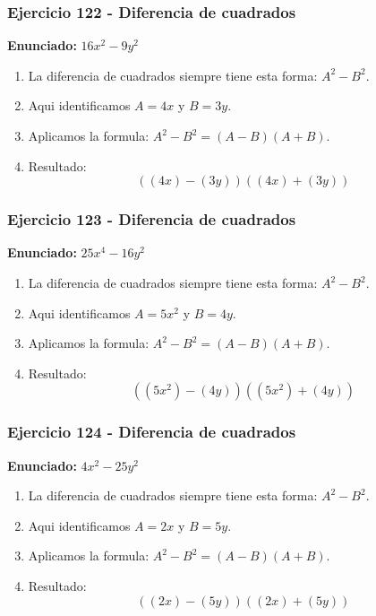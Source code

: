 \documentclass[11pt,a4paper]{article}
\begin{document}
\vspace{0.2cm}
\subsubsection*{Ejercicio 122 - Diferencia de cuadrados}
\textbf{Enunciado:} $ 16 x^{2} - 9 y^{2} $\par
\begin{enumerate}[leftmargin=2em]
\item La diferencia de cuadrados siempre tiene esta forma: \(A^2-B^2\).
\item Aqui identificamos \(A=4 x\) y \(B=3 y\).
\item Aplicamos la formula: \(A^2-B^2=(A-B)(A+B)\).
\item Resultado: \[\boxed{\left(\left(4 x\right)-\left(3 y\right)\right)\left(\left(4 x\right)+\left(3 y\right)\right)}\]
\end{enumerate}

\vspace{0.2cm}
\subsubsection*{Ejercicio 123 - Diferencia de cuadrados}
\textbf{Enunciado:} $ 25 x^{4} - 16 y^{2} $\par
\begin{enumerate}[leftmargin=2em]
\item La diferencia de cuadrados siempre tiene esta forma: \(A^2-B^2\).
\item Aqui identificamos \(A=5 x^{2}\) y \(B=4 y\).
\item Aplicamos la formula: \(A^2-B^2=(A-B)(A+B)\).
\item Resultado: \[\boxed{\left(\left(5 x^{2}\right)-\left(4 y\right)\right)\left(\left(5 x^{2}\right)+\left(4 y\right)\right)}\]
\end{enumerate}

\vspace{0.2cm}
\subsubsection*{Ejercicio 124 - Diferencia de cuadrados}
\textbf{Enunciado:} $ 4 x^{2} - 25 y^{2} $\par
\begin{enumerate}[leftmargin=2em]
\item La diferencia de cuadrados siempre tiene esta forma: \(A^2-B^2\).
\item Aqui identificamos \(A=2 x\) y \(B=5 y\).
\item Aplicamos la formula: \(A^2-B^2=(A-B)(A+B)\).
\item Resultado: \[\boxed{\left(\left(2 x\right)-\left(5 y\right)\right)\left(\left(2 x\right)+\left(5 y\right)\right)}\]
\end{enumerate}
\end{document}

